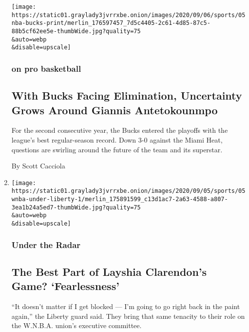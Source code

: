 \begin{enumerate}
  \texttt{[image: https://static01.graylady3jvrrxbe.onion/images/2020/09/06/sports/05nba-bucks-print/merlin\_176597457\_7d5c4405-2c61-4d85-87c5-88b5cf62ee5e-thumbWide.jpg?quality=75\\\&auto=webp\\\&disable=upscale]}

  \hypertarget{on-pro-basketball-2}{%
  \subsubsection{on pro basketball}\label{on-pro-basketball-2}}

  \hypertarget{with-bucks-facing-elimination-uncertainty-grows-around-giannis-antetokounmpo}{%
  \subsection{With Bucks Facing Elimination, Uncertainty Grows Around
  Giannis
  Antetokounmpo}\label{with-bucks-facing-elimination-uncertainty-grows-around-giannis-antetokounmpo}}

  For the second consecutive year, the Bucks entered the playoffs with
  the league's best regular-season record. Down 3-0 against the Miami
  Heat, questions are swirling around the future of the team and its
  superstar.

  By Scott Cacciola
\item
  \href{/2020/09/05/sports/basketball/wnba-layshia-clarendon-liberty.html}{}

  \texttt{[image: https://static01.graylady3jvrrxbe.onion/images/2020/09/05/sports/05wnba-under-liberty-1/merlin\_175891599\_c13d1ac7-2a63-4588-a807-3ea1b24a5ed7-thumbWide.jpg?quality=75\\\&auto=webp\\\&disable=upscale]}

  \hypertarget{under-the-radar}{%
  \subsubsection{Under the Radar}\label{under-the-radar}}

  \hypertarget{the-best-part-of-layshia-clarendons-game-fearlessness}{%
  \subsection{The Best Part of Layshia Clarendon's Game?
  `Fearlessness'}\label{the-best-part-of-layshia-clarendons-game-fearlessness}}

  ``It doesn't matter if I get blocked --- I'm going to go right back in
  the paint again,'' the Liberty guard said. They bring that same
  tenacity to their role on the W.N.B.A. union's executive committee.


\end{enumerate}
